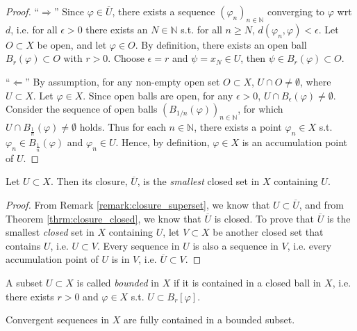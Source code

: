 \begin{proof}
	\enquote{$\Longrightarrow$} Since $\varphi\in\overline{U}$, there exists a sequence $\left(\varphi_n\right)_{n\in\mathbb N}$ converging to $\varphi$ wrt $d$, i.e. for all $\epsilon > 0$ there exists an $N\in\mathbb N$ s.t. for all $n\geq N$, $d(\varphi_n, \varphi) < \epsilon$. Let $O\subset X$ be open, and let $\varphi\in O$. By definition, there exists an open ball $B_{r}(\varphi)\subset O$ with $r > 0$. Choose $\epsilon = r$ and $\psi = x_{N}\in U$, then $\psi\in B_{r}(\varphi) \subset O$.
	
	\enquote{$\Longleftarrow$} By assumption, for any non-empty open set $O\subset X$, $U\cap O\ne\emptyset$, where $U\subset X$. Let $\varphi\in X$. Since open balls are open, for any $\epsilon > 0$, $U\cap B_{\epsilon}(\varphi)\ne\emptyset$. Consider the sequence of open balls $\left( B_{1/n}(\varphi)\right)_{n\in\mathbb N}$, for which $U\cap B_{\frac{1}{n}}(\varphi) \ne \emptyset$ holds. Thus for each $n\in\mathbb N$, there exists a point $\varphi_{n}\in X$ s.t. $\varphi_n \in B_{\frac{1}{n}}(\varphi)$ and $\varphi_n\in U$. Hence, by definition, $\varphi\in X$ is an accumulation point of $U$.
\end{proof}

\begin{theorem}
	Let $U\subset X$. Then its closure, $\overline{U}$, is the \textit{smallest} closed set in $X$ containing $U$.
\end{theorem}

\begin{proof}
	From Remark \ref{remark:closure_superset}, we know that $U\subset \overline{U}$, and from Theorem \ref{thrm:closure_closed}, we know that $\overline{U}$ is closed. To prove that $\overline{U}$ is the smallest \textit{closed} set in $X$ containing $U$, let $V\subset X$ be another closed set that contains $U$, i.e. $U\subset V$. Every sequence in $U$ is also a sequence in $V$, i.e. every accumulation point of $U$ is in $V$, i.e. $\overline{U}\subset V$.
\end{proof}

\begin{defn}\label{defn:bounded_set}
	A subset $U\subset X$ is called \textit{bounded} in $X$ if it is contained in a closed ball in $X$, i.e. there exists $r > 0$ and $\varphi \in X$ s.t. $U\subset B_{r}[\varphi]$.
\end{defn}

\begin{theorem}
	Convergent sequences in $X$ are fully contained in a bounded subset.
\end{theorem}

